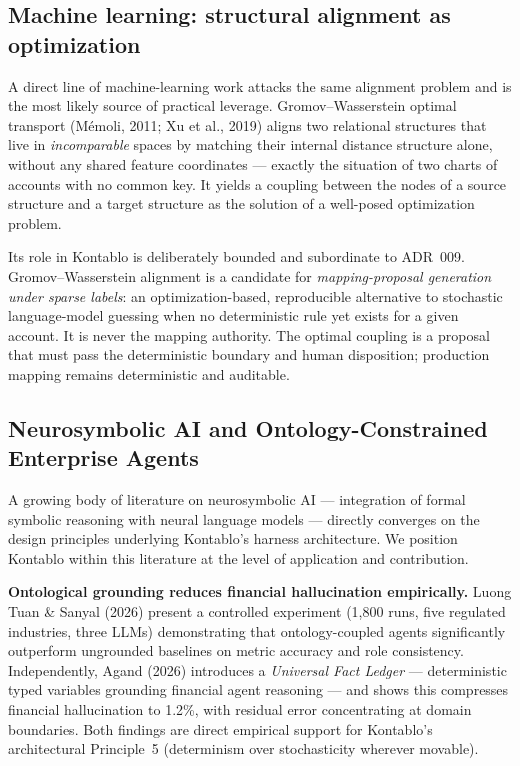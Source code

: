 \subsection{Machine learning: structural alignment as optimization}
A direct line of machine-learning work attacks the same alignment problem and is the most
likely source of practical leverage. Gromov--Wasserstein optimal transport (Mémoli, 2011;
Xu et al., 2019) aligns two relational structures that live in \emph{incomparable} spaces by
matching their internal distance structure alone, without any shared feature coordinates ---
exactly the situation of two charts of accounts with no common key. It yields a coupling
between the nodes of a source structure and a target structure as the solution of a
well-posed optimization problem.

Its role in Kontablo is deliberately bounded and subordinate to ADR~009. Gromov--Wasserstein
alignment is a candidate for \emph{mapping-proposal generation under sparse labels}: an
optimization-based, reproducible alternative to stochastic language-model guessing when no
deterministic rule yet exists for a given account. It is never the mapping authority. The
optimal coupling is a proposal that must pass the deterministic boundary and human
disposition; production mapping remains deterministic and auditable.

\subsection{Neurosymbolic AI and Ontology-Constrained Enterprise Agents}

A growing body of literature on neurosymbolic AI --- integration of formal
symbolic reasoning with neural language models --- directly converges on the
design principles underlying Kontablo's harness architecture. We position
Kontablo within this literature at the level of application and contribution.

\textbf{Ontological grounding reduces financial hallucination empirically.}
Luong Tuan \& Sanyal (2026) present a controlled experiment (1,800 runs, five
regulated industries, three LLMs) demonstrating that ontology-coupled agents
significantly outperform ungrounded baselines on metric accuracy and role
consistency. Independently, Agand (2026) introduces a
\emph{Universal Fact Ledger} --- deterministic typed variables grounding
financial agent reasoning --- and shows this compresses financial hallucination
to 1.2\%, with residual error concentrating at domain boundaries. Both
findings are direct empirical support for Kontablo's architectural
Principle~5 (determinism over stochasticity wherever movable).

